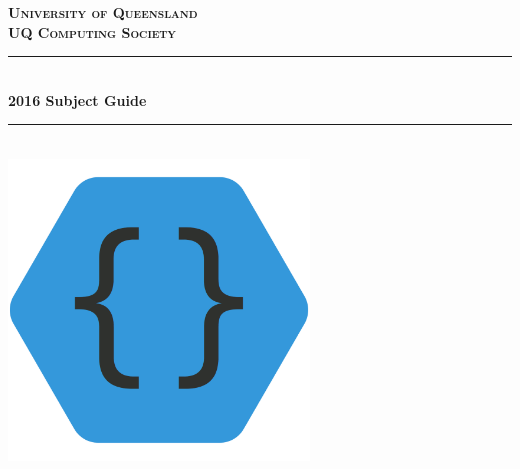 \begin{titlepage}
	\vspace*{\fill}
	
	\newcommand{\HRule}{\rule{\linewidth}{0.75mm}} %
	
	\center
	
	\textsc{\Large \bfseries University of Queensland}\\[1.75cm]
	\textsc{\LARGE \bfseries UQ Computing Society}\\[1cm]
	
	\HRule \\[0.75cm]
	{\huge \bfseries 2016 Subject Guide}\\[0.4cm] %
	\HRule \\[1.5cm]
	
	\includegraphics[width=8cm]{assets/logo}\\[1cm]
	
	\vspace*{\fill}

	\vfill %
\end{titlepage}
